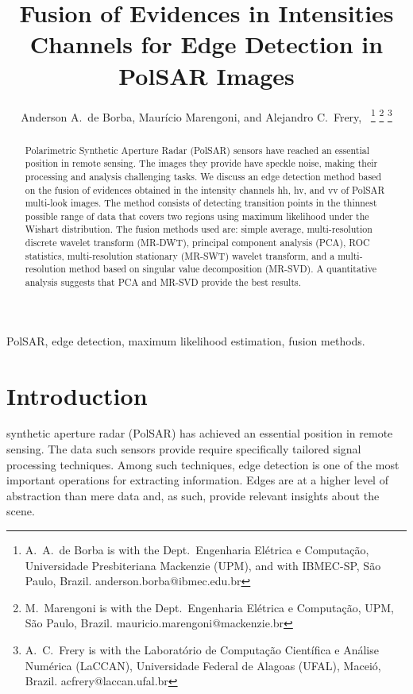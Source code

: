 \documentclass[journal]{IEEEtran}
\begin{document}
\title{Fusion of Evidences in Intensities Channels for Edge Detection in PolSAR Images}
\author{Anderson A.\ de Borba, Maurício Marengoni, and Alejandro C.\ Frery,~%
\thanks{A.\ A.\ de Borba is with the Dept.\ Engenharia Elétrica e Computação, Universidade Presbiteriana Mackenzie (UPM), and with IBMEC-SP, São Paulo, Brazil. anderson.borba@ibmec.edu.br}
\thanks{M.\ Marengoni is with the Dept.\ Engenharia Elétrica e Computação,
UPM, São Paulo, Brazil. mauricio.marengoni@mackenzie.br}
\thanks{A.\ C.\ Frery is with the Laboratório de Computação Científica e Análise Numérica (LaCCAN), Universidade Federal de Alagoas (UFAL), Maceió, Brazil. acfrery@laccan.ufal.br}}

\maketitle

\begin{abstract}
Polarimetric Synthetic Aperture Radar (PolSAR) sensors have reached an essential position in remote sensing. 
The images they provide have speckle noise, making their processing and analysis challenging tasks. 
We discuss an edge detection method based on the fusion of evidences obtained in the intensity channels hh, hv, and vv of PolSAR multi-look images. 
The method consists of detecting transition points in the thinnest possible range of data that covers two regions using maximum likelihood under the Wishart distribution. 
The fusion methods used are: 
simple average, 
multi-resolution discrete wavelet transform (MR-DWT),
principal component analysis (PCA), 
ROC statistics, 
multi-resolution stationary (MR-SWT) wavelet transform, 
and a multi-resolution method based on singular value decomposition (MR-SVD). 
A quantitative analysis suggests that PCA and MR-SVD provide the best results.
\end{abstract}

\begin{IEEEkeywords}
PolSAR, edge detection, maximum likelihood estimation, fusion methods. 
\end{IEEEkeywords}

\section{Introduction}\label{sec_01}
 synthetic aperture radar (PolSAR) has achieved an essential position in remote sensing. 
The data such sensors provide require specifically tailored signal processing techniques.
Among such techniques, edge detection is one of the most important operations for extracting information.
Edges are at a higher level of abstraction than mere data and, as such, provide relevant insights about the scene.
\end{document}
